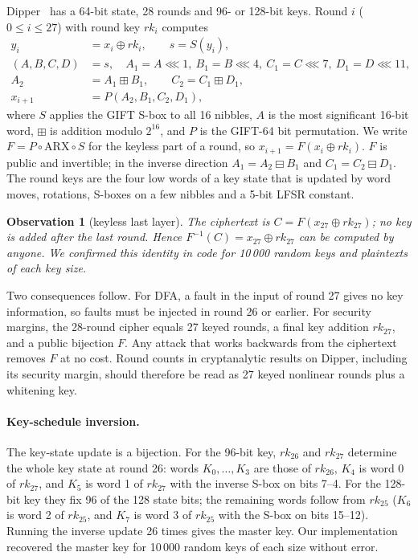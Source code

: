 \documentclass[11pt,a4paper]{article}
\newtheorem{observation}{Observation}
\newcommand{\rk}{\mathit{rk}}
\newcommand{\Finv}{F^{-1}}
\begin{document}
Dipper~\cite{Dipper2026} has a 64-bit state, 28 rounds and 96- or 128-bit keys. Round $i$
($0\le i\le 27$) with round key $\rk_i$ computes
\begin{align*}
y_i &= x_i \oplus \rk_i, \qquad s = S(y_i),\\
(A,B,C,D) &= s, \quad A_1=A\lll 1,\ B_1=B\lll 4,\ C_1=C\lll 7,\ D_1=D\lll 11,\\
A_2 &= A_1 \boxplus B_1,\qquad C_2 = C_1 \boxplus D_1,\\
x_{i+1} &= P(A_2, B_1, C_2, D_1),
\end{align*}
where $S$ applies the GIFT S-box to all 16 nibbles, $A$ is the most significant 16-bit word,
$\boxplus$ is addition modulo $2^{16}$, and $P$ is the GIFT-64 bit permutation. We write
$F = P\circ \mathrm{ARX}\circ S$ for the keyless part of a round, so $x_{i+1} = F(x_i\oplus\rk_i)$.
$F$ is public and invertible; in the inverse direction $A_1 = A_2 \boxminus B_1$ and
$C_1 = C_2 \boxminus D_1$. The round keys are the four low words of a key state that is
updated by word moves, rotations, S-boxes on a few nibbles and a 5-bit LFSR constant.

\begin{observation}[keyless last layer]\label{obs:last}
The ciphertext is $C = F(x_{27}\oplus \rk_{27})$; no key is added after the last round. Hence
$\Finv(C) = x_{27}\oplus\rk_{27}$ can be computed by anyone. We confirmed this identity in code
for 10\,000 random keys and plaintexts of each key size.
\end{observation}

Two consequences follow. For DFA, a fault in the input of round 27 gives no key information,
so faults must be injected in round 26 or earlier. For security margins, the 28-round cipher
equals 27 keyed rounds, a final key addition $\rk_{27}$, and a public bijection $F$. Any attack
that works backwards from the ciphertext removes $F$ at no cost. Round counts in
cryptanalytic results on Dipper, including its security margin, should therefore be read as
27 keyed nonlinear rounds plus a whitening key.

\paragraph{Key-schedule inversion.} The key-state update is a bijection. For the 96-bit key,
$\rk_{26}$ and $\rk_{27}$ determine the whole key state at round 26: words $K_0,\dots,K_3$ are
those of $\rk_{26}$, $K_4$ is word 0 of $\rk_{27}$, and $K_5$ is word 1 of $\rk_{27}$ with the
inverse S-box on bits 7--4. For the 128-bit key they fix 96 of the 128 state bits; the remaining
words follow from $\rk_{25}$ ($K_6$ is word 2 of $\rk_{25}$, and $K_7$ is word 3 of $\rk_{25}$
with the S-box on bits 15--12). Running the inverse update 26 times gives the master key. Our
implementation recovered the master key for 10\,000 random keys of each size without error.
\end{document}

